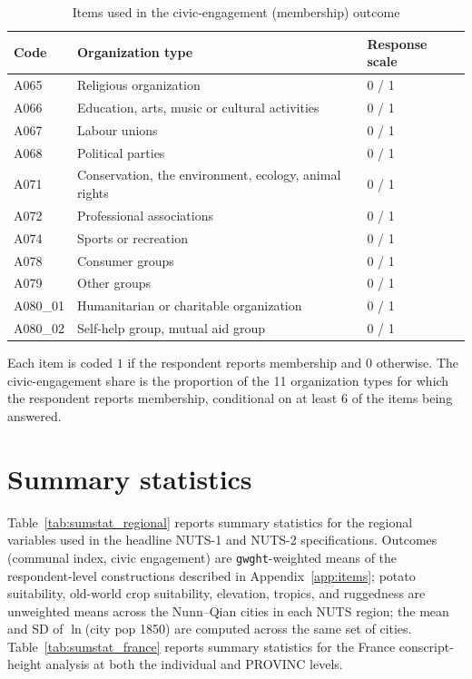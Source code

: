 \FloatBarrier   %

\begin{table}[!htbp]\centering
\caption{Items used in the civic-engagement (membership) outcome}
\label{tab:items_civic}
\footnotesize
\begin{threeparttable}
\begin{tabular}{p{1.2cm} p{10.5cm} p{2.2cm}}
\toprule
Code & Organization type & Response scale \\
\midrule
A065 & Religious organization & 0 / 1 \\
A066 & Education, arts, music or cultural activities & 0 / 1 \\
A067 & Labour unions & 0 / 1 \\
A068 & Political parties & 0 / 1 \\
A071 & Conservation, the environment, ecology, animal rights & 0 / 1 \\
A072 & Professional associations & 0 / 1 \\
A074 & Sports or recreation & 0 / 1 \\
A078 & Consumer groups & 0 / 1 \\
A079 & Other groups & 0 / 1 \\
A080\_01 & Humanitarian or charitable organization & 0 / 1 \\
A080\_02 & Self-help group, mutual aid group & 0 / 1 \\
\bottomrule
\end{tabular}
\begin{tablenotes}\footnotesize
\item Each item is coded $1$ if the respondent reports membership and $0$
otherwise. The civic-engagement share is the proportion of the 11 organization
types for which the respondent reports membership, conditional on at least 6
of the items being answered.
\end{tablenotes}
\end{threeparttable}
\end{table}

\FloatBarrier   %

\section{Summary statistics}
\label{app:summary}

Table~\ref{tab:sumstat_regional} reports summary statistics for the regional
variables used in the headline NUTS-1 and NUTS-2 specifications. Outcomes
(communal index, civic engagement) are \texttt{gwght}-weighted means of the
respondent-level constructions described in Appendix~\ref{app:items}; potato
suitability, old-world crop suitability, elevation, tropics, and ruggedness are
unweighted means across the Nunn--Qian cities in each NUTS region; the mean and SD of
$\ln$(city pop 1850) are computed across the same set of cities. Table~\ref{tab:sumstat_france}
reports summary statistics for the France conscript-height analysis at both the
individual and PROVINC levels.

